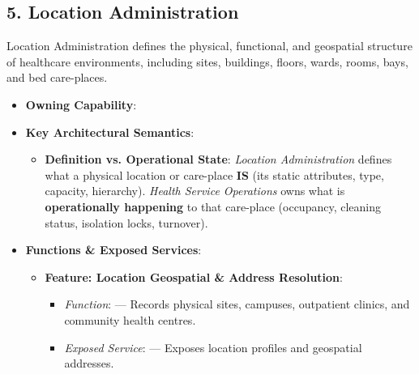 \par\smallskip
{}\label{rad:em:136}
\subsection*{5. Location Administration}
\label{rad:em:138}

Location Administration defines the physical, functional, and geospatial structure of healthcare environments, including sites, buildings, floors, wards, rooms, bays, and bed care-places.

\label{rad:em:140}

\begin{itemize}

\item
\textbf{Owning Capability}: \texttt{}



\item
\textbf{Key Architectural Semantics}:


\begin{itemize}

\item
\textbf{Definition vs. Operational State}: \emph{Location Administration} defines what a physical location or care-place \textbf{IS} (its static attributes, type, capacity, hierarchy). \emph{Health Service Operations} owns what is \textbf{operationally happening} to that care-place (occupancy, cleaning status, isolation locks, turnover).



\end{itemize}


\item
\textbf{Functions \& Exposed Services}:


\begin{itemize}

\item
\textbf{Feature: Location Geospatial \& Address Resolution}:


\begin{itemize}

\item
\emph{Function}: \texttt{} — Records physical sites, campuses, outpatient clinics, and community health centres.



\item
\emph{Exposed Service}: \texttt{} — Exposes location profiles and geospatial addresses.




\end{itemize}
\end{itemize}
\end{itemize}
